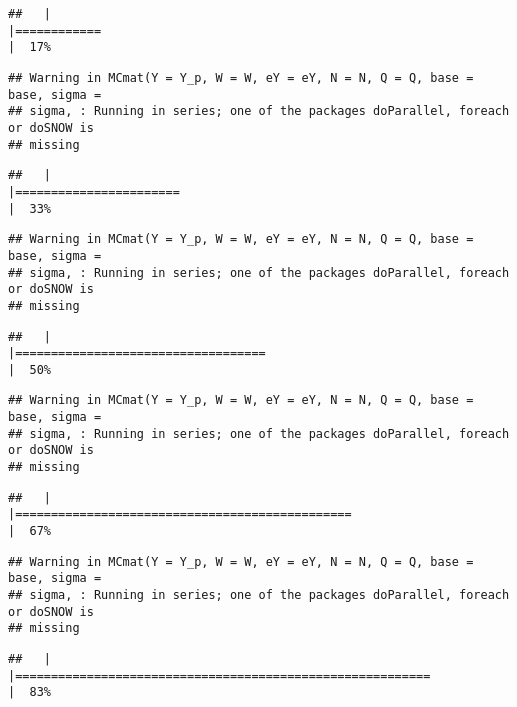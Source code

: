 \documentclass[]{article}
\begin{document}
\begin{verbatim}
##   |                                                                              |============                                                          |  17%
\end{verbatim}

\begin{verbatim}
## Warning in MCmat(Y = Y_p, W = W, eY = eY, N = N, Q = Q, base = base, sigma =
## sigma, : Running in series; one of the packages doParallel, foreach or doSNOW is
## missing
\end{verbatim}

\begin{verbatim}
##   |                                                                              |=======================                                               |  33%
\end{verbatim}

\begin{verbatim}
## Warning in MCmat(Y = Y_p, W = W, eY = eY, N = N, Q = Q, base = base, sigma =
## sigma, : Running in series; one of the packages doParallel, foreach or doSNOW is
## missing
\end{verbatim}

\begin{verbatim}
##   |                                                                              |===================================                                   |  50%
\end{verbatim}

\begin{verbatim}
## Warning in MCmat(Y = Y_p, W = W, eY = eY, N = N, Q = Q, base = base, sigma =
## sigma, : Running in series; one of the packages doParallel, foreach or doSNOW is
## missing
\end{verbatim}

\begin{verbatim}
##   |                                                                              |===============================================                       |  67%
\end{verbatim}

\begin{verbatim}
## Warning in MCmat(Y = Y_p, W = W, eY = eY, N = N, Q = Q, base = base, sigma =
## sigma, : Running in series; one of the packages doParallel, foreach or doSNOW is
## missing
\end{verbatim}

\begin{verbatim}
##   |                                                                              |==========================================================            |  83%
\end{verbatim}
\end{document}
